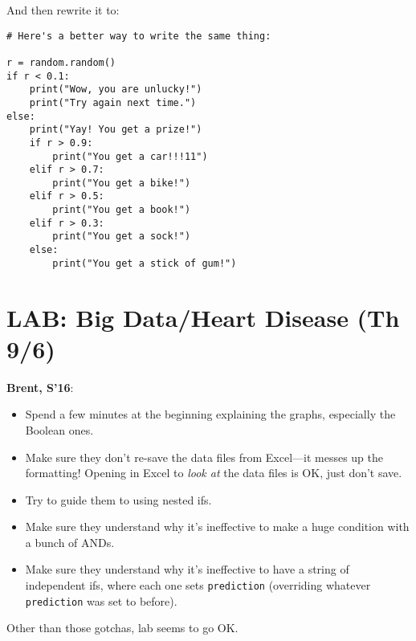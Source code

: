 \documentclass{article}
\newenvironment{reflect}[1]
{
  \noindent
  \begin{lrbox}{\reflectbox}
    \begin{minipage}[t]{\textwidth}
      \textbf{#1}:
}{
    \end{minipage}
  \end{lrbox}
  \fbox{\usebox{\reflectbox}}
}
\begin{document}
And then rewrite it to:
\begin{verbatim}
# Here's a better way to write the same thing:

r = random.random()
if r < 0.1:
    print("Wow, you are unlucky!")
    print("Try again next time.")
else:
    print("Yay! You get a prize!")
    if r > 0.9:
        print("You get a car!!!11")
    elif r > 0.7:
        print("You get a bike!")
    elif r > 0.5:
        print("You get a book!")
    elif r > 0.3:
        print("You get a sock!")
    else:
        print("You get a stick of gum!")
\end{verbatim}

\newpage
\section*{LAB: Big Data/Heart Disease (Th 9/6)}

\begin{reflect}{Brent, S'16}
  \begin{itemize}
  \item Spend a few minutes at the beginning explaining the graphs,
    especially the Boolean ones.
  \item Make sure they don't re-save the data files from Excel---it
    messes up the formatting!  Opening in Excel to \emph{look at} the
    data files is OK, just don't save.
  \item Try to guide them to using nested ifs.
  \item Make sure they understand why it's ineffective to make a huge
    condition with a bunch of ANDs.
  \item Make sure they understand why it's ineffective to have a
    string of independent ifs, where each one sets \texttt{prediction}
    (overriding whatever \texttt{prediction} was set to before).
  \end{itemize}

  Other than those gotchas, lab seems to go OK.
\end{reflect}
\end{document}
